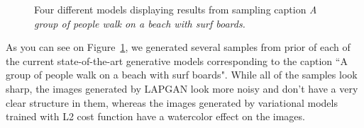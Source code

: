 \documentclass{article} %
\begin{document}
\begin{figure}[!t]
\captionsetup[subfigure]{labelformat=empty}
\begin{center}
\quad
%
\quad
%
\quad
%
\quad
%
\end{center}
\caption{Four different models displaying results from sampling caption \textit{A group of people walk on a beach with surf boards.}}
\label{fig:diffmodels}
\vspace{-0.2cm}
\end{figure}

As you can see on Figure~\ref{fig:diffmodels}, we generated several samples from prior of each of the current state-of-the-art generative models corresponding to the caption ``A group of people walk on a beach with surf boards". While all of the samples look sharp, the images generated by LAPGAN look more noisy and don't have a very clear structure in them, whereas the images generated by variational models trained with L2 cost function have a watercolor effect on the images.
\end{document}
